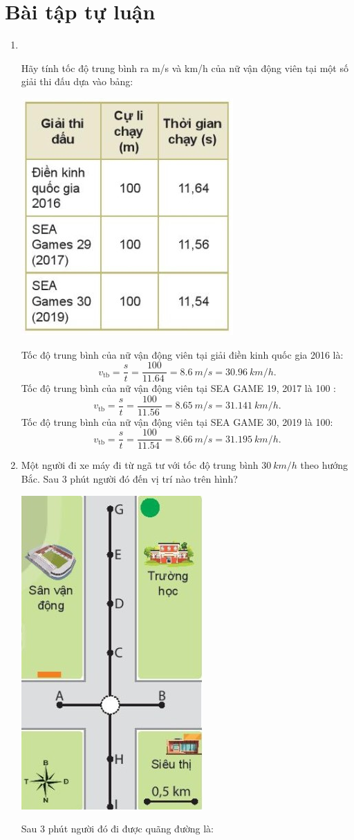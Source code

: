 \section{Bài tập tự luận}
\begin{enumerate}[label=\bfseries Bài \arabic*:,leftmargin=1.5cm]
	\item {}\\
	{		Hãy tính tốc độ trung bình ra m/s và km/h của nữ vận động viên tại một số giải thi đấu dựa vào bảng:
		\begin{center}
			\includegraphics[width=0.3\linewidth]{../figs/VN10-2022-PH-TP005-5.jpg}
		\end{center}
	}
	\hideall
	{		Tốc độ trung bình của nữ vận động viên tại giải điền kinh quốc  gia 2016 là:
		$$v_\text{tb} = \dfrac{s}{t} =\dfrac{100}{\SI{11,64}{}} = \SI{8,6}{m/s} = \SI{30,96}{km/h}.$$
		Tốc độ trung bình của nữ vận động viên tại SEA GAME 19, 2017  là 100 : 
		$$v_\text{tb} = \dfrac{s}{t} =\dfrac{100}{\SI{11,56}{}} = \SI{8,65}{m/s} = \SI{31,141}{km/h}.$$
		Tốc độ trung bình của nữ vận động viên tại SEA GAME 30, 2019 là 100: 
		$$v_\text{tb} = \dfrac{s}{t} =\dfrac{100}{\SI{11,54}{}}= \SI{8,66}{m/s} = \SI{31,195}{km/h}.$$
	}

	\item {}
	
	
	{
		Một người đi xe máy đi từ ngã tư với tốc độ trung bình $\SI{30}{km/h}$ theo hướng Bắc. Sau 3 phút người đó đến vị trí nào trên hình?
		\begin{center}
			\includegraphics[width=0.25\linewidth]{../figs/VN10-2022-PH-TP005-1.jpg}
		\end{center}
	}
	\hideall
	{
		Sau 3 phút người đó đi được quãng đường là:
		
}
\end{enumerate}
